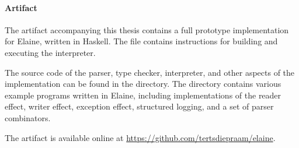 \paragraph{Artifact}
The artifact accompanying this thesis contains a full prototype implementation for Elaine, written in Haskell. The  file contains instructions for building and executing the interpreter.

The source code of the parser, type checker, interpreter, and other aspects of the implementation can be found in the  directory. The  directory contains various example programs written in Elaine, including implementations of the reader effect, writer effect, exception effect, structured logging, and a set of parser combinators.

The artifact is available online at \url{https://github.com/tertsdiepraam/elaine}.
